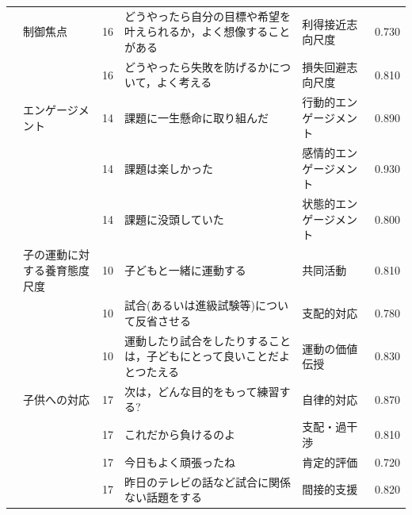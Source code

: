 \begin{landscape}
\begin{longtable}{p{2cm}p{2cm}p{2cm}p{6cm}p{2cm}p{2cm}}
        \citet{Toyama202192}     & 制御焦点                             & 16  & どうやったら自分の目標や希望を叶えられるか，よく想像することがある                   & 利得接近志向尺度             & 0.730   \\
                                 &                                  & 16  & どうやったら失敗を防げるかについて，よく考える                             & 損失回避志向尺度             & 0.810   \\
                                 & エンゲージメント                         & 14  & 課題に一生懸命に取り組んだ                                       & 行動的エンゲージメント          & 0.890   \\
                                 &                                  & 14  & 課題は楽しかった                                            & 感情的エンゲージメント          & 0.930   \\
                                 &                                  & 14  & 課題に没頭していた                                           & 状態的エンゲージメント          & 0.800   \\
        \citet{Togo202192}       & 子の運動に対する養育態度尺度                   & 10  & 子どもと一緒に運動する                                         & 共同活動                 & 0.810   \\
                                 &                                  & 10  & 試合(あるいは進級試験等)について反省させる                              & 支配的対応                & 0.780   \\
                                 &                                  & 10  & 運動したり試合をしたりすることは，子どもにとって良いことだよとつたえる                 & 運動の価値伝授              & 0.830   \\
                                 & 子供への対応                           & 17  & 次は，どんな目的をもって練習する?                                   & 自律的対応                & 0.870   \\
                                 &                                  & 17  & これだから負けるのよ                                          & 支配・過干渉               & 0.810   \\
                                 &                                  & 17  & 今日もよく頑張ったね                                          & 肯定的評価                & 0.720   \\
                                 &                                  & 17  & 昨日のテレビの話など試合に関係ない話題をする                              & 間接的支援                & 0.820   \\

\end{longtable}
\end{landscape}
